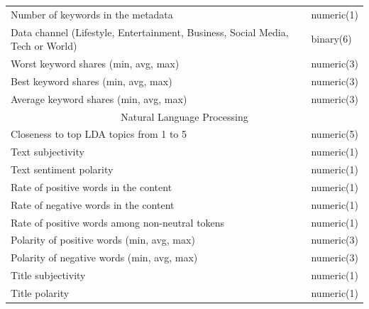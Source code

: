 \documentclass{beamer}
\begin{document}
\begin{frame}
{\begin{tabular}{ l | l }
            \hline
            Number of keywords in the metadata & numeric(1) \\
            Data channel (Lifestyle, Entertainment, Business, Social Media, Tech or World) & binary(6) \\
            Worst keyword shares (min, avg, max) & numeric(3) \\
            Best keyword shares (min, avg, max) & numeric(3) \\
            Average keyword shares (min, avg, max) & numeric(3) \\
            \hline
            \multicolumn{2}{c}{Natural Language Processing}\\
            \hline
            Closeness to top LDA topics from 1 to 5 & numeric(5) \\
            Text subjectivity & numeric(1) \\
            Text sentiment polarity & numeric(1) \\
            Rate of positive words in the content & numeric(1) \\
            Rate of negative words in the content & numeric(1) \\
            Rate of positive words among non-neutral tokens & numeric(1) \\
            Polarity of positive words (min, avg, max) & numeric(3) \\
            Polarity of negative words (min, avg, max) & numeric(3) \\
            Title subjectivity & numeric(1) \\
            Title polarity & numeric(1) \\
            \hline\hline
        \end{tabular}
        }
        
    
\end{frame}

\end{document}
